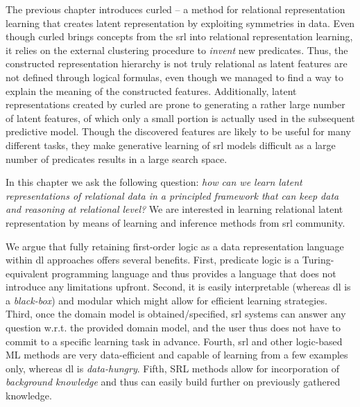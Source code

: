 The previous chapter introduces \gls{curled} -- a method for relational representation learning that creates latent representation by exploiting symmetries in data.
Even though \gls{curled} brings concepts from the \gls{srl} into relational representation learning, it relies on the external clustering procedure to \textit{invent} new predicates.
Thus, the constructed representation hierarchy  is not truly relational as latent features are not defined through logical formulas, even though we managed to find a way to explain the meaning of the constructed features.
Additionally, latent representations created by \gls{curled} are prone to generating a rather large number of latent features, of which only a small portion  is actually used in the subsequent predictive model.
Though the discovered features are likely to be useful for many different tasks, they make generative learning of \gls{srl} models difficult as a large number of predicates results in a large search space.





In this chapter we ask the following question: \textit{how can we learn latent representations of relational data in a principled framework that can keep data and reasoning at relational level?}
We are interested in learning relational latent representation by means of learning and inference methods from \gls{srl} community.



We argue that fully retaining first-order logic as a data representation language within \gls{dl} approaches offers several benefits.
First, predicate logic is a Turing-equivalent programming language and thus provides a language that does not introduce any limitations upfront.
Second, it is easily interpretable (whereas \gls{dl} is a \textit{black-box}) and modular which might allow for efficient learning strategies.
Third, once the domain model is obtained/specified, \gls{srl} systems can answer any question w.r.t. the provided domain model, and the user thus does not have to commit to a specific learning task in advance.
Fourth, \gls{srl} and other logic-based ML methods are very data-efficient and capable of learning from a few examples only, whereas \gls{dl} is \textit{data-hungry}.
Fifth, SRL methods allow for incorporation of \textit{background knowledge} and thus can easily build further on previously gathered knowledge.






